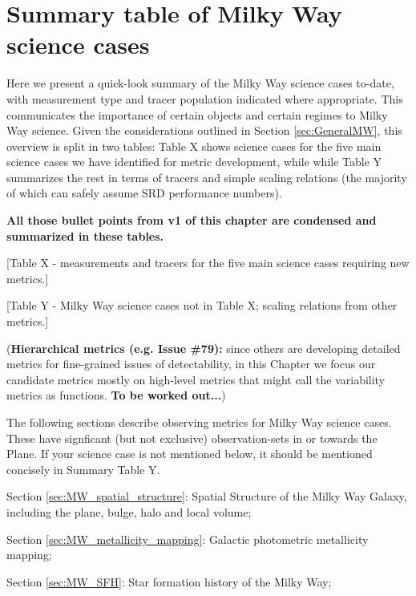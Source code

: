 \section{Summary table of Milky Way science cases}
\def\secname{SummaryTableMW}\label{sec:\secname}

Here we present a quick-look summary of the Milky Way science cases
to-date, with measurement type and tracer population indicated where
appropriate. This communicates the importance of certain objects and
certain regimes to Milky Way science. Given the considerations
outlined in Section \ref{sec:GeneralMW}, this overview is split in two
tables: Table X shows science cases for the five main science cases we
have identified for metric development, while while Table Y summarizes
the rest in terms of tracers and simple scaling relations (the
majority of which can safely assume SRD performance numbers).

{\bf All those bullet points from v1 of this chapter are condensed and summarized in these tables.}

[Table X - measurements and tracers for the five main science cases requiring new metrics.]

[Table Y - Milky Way science cases not in Table X; scaling relations from other metrics.]

({\bf Hierarchical metrics (e.g. Issue \#79):} since others are
developing detailed metrics for fine-grained issues of detectability,
in this Chapter we focus our candidate metrics mostly on high-level
metrics that might call the variability metrics as functions. {\bf To
  be worked out...})

The following sections describe observing metrics for Milky Way
science cases. These have signficant (but not exclusive)
observation-sets in or towards the Plane. If your science case is not
mentioned below, it should be mentioned concisely in Summary Table Y.


Section \ref{sec:MW_spatial_structure}: Spatial Structure of the Milky Way Galaxy, including the plane, bulge, halo and local volume;

Section \ref{sec:MW_metallicity_mapping}: Galactic photometric metallicity mapping; 

Section \ref{sec:MW_SFH}: Star formation history of the Milky Way;

